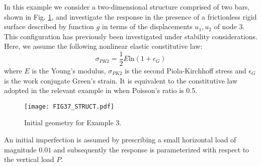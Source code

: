 In this example we consider a two-dimensional structure comprised of two bars,
shown in Fig. \ref{fig:FIG37_STRUCT}, and investigate the response in the 
presence of a
frictionless rigid surface described by function $g$ in terms of the
displacements $u_1,u_2$ of node 3. This configuration has previously been 
investigated under stability considerations\cite{Klarbring:1988,Bjorkman:1992}.
Here, we assume the following nonlinear elastic constitutive law:
\begin{equation}
	\sigma_{PK2} = \frac{1}{2}E\text{ln}(1+\epsilon_G)
	\label{eq:CONSTLAW}
\end{equation}
where $E$ is the Young's modulus, $\sigma_{PK2}$ is the second Piola-Kirchhoff
stress and $\epsilon_G$ is the work conjugate Green's strain. It is equivalent
to the constitutive law adopted in the relevant example in \cite{Bjorkman:1992}
when Poisson's ratio is 0.5. 
\begin{figure}[t]
	\centering
	\texttt{[image: FIG37\_STRUCT.pdf]}
	\caption{Initial geometry for Example 3.}
	\label{fig:FIG37_STRUCT}
\end{figure}
An initial imperfection is assumed by prescribing a
small horizontal load of magnitude $0.01$ and subsequently the response is 
parameterized with respect to the vertical load $P$. 

